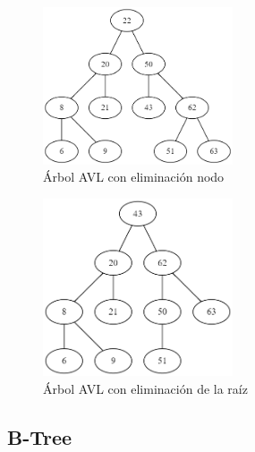 \documentclass{article}
\begin{document}
            \begin{figure}[htbp]
              \centering
              \includegraphics[width=0.5\textwidth]{img/avltree-deletion.png}
              \caption{Árbol AVL con eliminación nodo}
            \label{fig:avldelete}
            \end{figure}
             \begin{figure}[htbp]
              \centering
              \includegraphics[width=0.5\textwidth]{img/avltree-deletion-2.png}
              \caption{Árbol AVL con eliminación de la raíz}
              \label{fig:avldelete2}
            \end{figure}
        \subsection{B-Tree}
\end{document}

